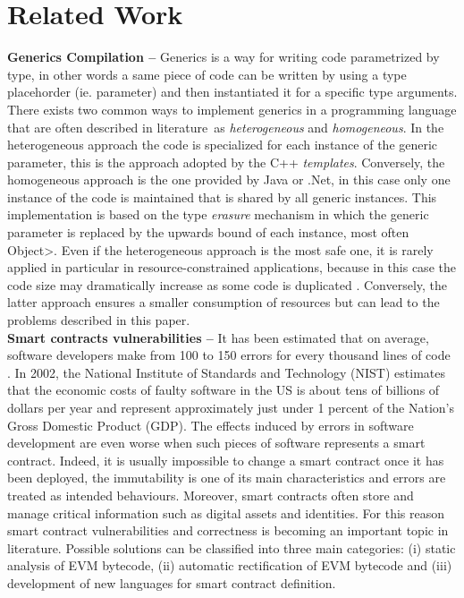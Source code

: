 \section{Related Work}\label{sec:related_work}



\textbf{Generics Compilation --} Generics is a way for writing code parametrized by type, in other words a same piece of code can be written by using a type placehorder (ie. parameter) and then instantiated it for a specific type arguments. There exists two common ways to implement generics in a programming language that are often described in literature\,\cite{generics_categories} as \textit{heterogeneous} and \textit{homogeneous}. In the heterogeneous approach the code is specialized for each instance of the generic parameter, this is the approach adopted by the C++ \emph{templates}. Conversely, the homogeneous approach is the one provided by Java or .Net, in this case only one instance of the code is maintained that is shared by all generic instances. This implementation is based on the type \emph{erasure} mechanism in which the generic parameter is replaced by the upwards bound of each instance, most often \<Object>.
%
Even if the heterogeneous approach is the most safe one, it is rarely applied in particular in resource-constrained applications, because in this case the code size  may dramatically increase as some code is duplicated \cite{generics_embedded_systems}. Conversely, the latter approach ensures a smaller consumption of resources but can lead to the problems described in this paper. \\

\noindent
\textbf{Smart contracts vulnerabilities --} It has been estimated that on average, software developers make from 100 to 150 errors for every thousand lines of code \cite{software_engineering}.
In 2002, the National Institute of Standards and Technology (NIST) estimates that the economic costs of faulty software in the US is about tens of billions of dollars per year and represent approximately just under 1 percent of the Nation's Gross Domestic Product (GDP). The effects induced by errors in software development are even worse when such pieces of software represents a smart contract. Indeed, it is usually impossible to change a smart contract once it has been deployed, the immutability is one of its main characteristics and errors are treated as intended behaviours. Moreover, smart contracts often store and
manage critical information such as digital assets and identities. For this reason smart contract vulnerabilities and correctness is becoming an important topic in literature. Possible solutions can be classified into three main categories: (i) static analysis of EVM bytecode, (ii) automatic rectification of EVM bytecode and (iii) development of new languages for smart contract definition. 

